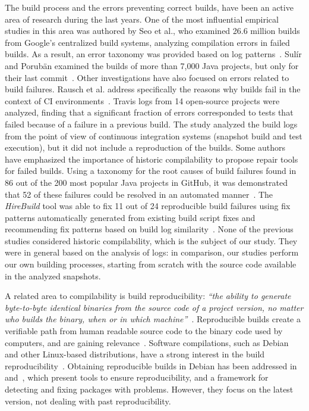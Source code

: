 The build process and the errors preventing correct builds, have been an active area of research during the last years.
One of the most influential empirical studies in this area was authored by Seo et al., who examined 26.6 million builds from Google's centralized build systems, analyzing compilation errors in failed builds. As a result, an error taxonomy was provided based on log patterns~\cite{Seo:2014:PBE:2568225.2568255}.
Sulír and Porubän examined the builds of more than 7,000 Java projects, but only for their last commit~\cite{Sulir:2016:QSJ:3001878.3001882}. 
Other investigations have also focused on errors related to build failures. 
Rausch et al. address specifically the reasons why builds fail in the context of CI environments~\cite{Rausch:2017:EAB:3104188.3104231}.
Travis logs from 14 open-source projects were analyzed, finding that a significant fraction of errors corresponded to tests that failed because of a failure in a previous build.
The study analyzed the build logs from the point of view of continuous integration systems (snapshot build and test execution), but it did not include a reproduction of the builds.
Some authors have emphasized the importance of historic compilability to propose repair tools for failed builds.
Using a taxonomy for the root causes of build failures found in 86 out of the 200 most popular Java projects in GitHub, it was demonstrated that 52 of these failures could be resolved in an automated manner~\cite{hassan2017automatic}.
The \textit{HireBuild} tool was able to fix 11 out of 24 reproducible build failures using fix patterns automatically generated from existing build script fixes and recommending fix patterns based on build log similarity~\cite{HireBuild}.
None of the previous studies considered historic compilability, which is the subject of our study. They were in general based on the analysis of logs: in comparison, our studies perform our own building processes, starting from scratch with the source code available in the analyzed snapshots.

A related area to compilability is build reproducibility: \emph{``the ability to generate byte-to-byte identical binaries from the source code of a project version, no matter who builds the binary, when or in which machine''}~\cite{RepBlds:2017:Online}. 
Reproducible builds create a verifiable path from human readable source code to the binary code used by computers, and are gaining relevance~\cite{cito2017empirical,maudoux2018correct,deCarnedeCarnavalet:2014:CIV:2664243.2664288,perry2014reproducible}. 
Software compilations, such as Debian and other Linux-based distributions, have a strong interest in the build reproducibility~\cite{RepBlds:2017:Online}. Obtaining reproducible builds in Debian has been addressed in~\cite{Glukhova:Thesis:2017} and~\cite{Ren:2018:ALU:3180155.3180224}, which present tools to ensure reproducibility, and a framework for detecting and fixing packages with problems. 
However, they focus on the latest version, not dealing with past reproducibility.

